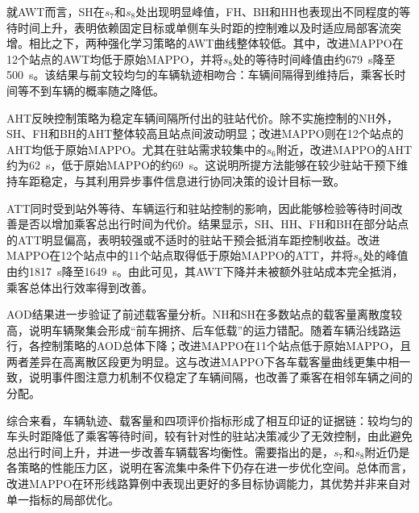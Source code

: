 就AWT而言，SH在$s_7$和$s_8$处出现明显峰值，FH、BH和HH也表现出不同程度的等待时间上升，表明依赖固定目标或单侧车头时距的控制难以及时适应局部客流突增。相比之下，两种强化学习策略的AWT曲线整体较低。其中，改进MAPPO在12个站点的AWT均低于原始MAPPO，并将$s_8$处的等待时间峰值由约679~s降至500~s。该结果与前文较均匀的车辆轨迹相吻合：车辆间隔得到维持后，乘客长时间等不到车辆的概率随之降低。

AHT反映控制策略为稳定车辆间隔所付出的驻站代价。除不实施控制的NH外，SH、FH和BH的AHT整体较高且站点间波动明显；改进MAPPO则在12个站点的AHT均低于原始MAPPO。尤其在驻站需求较集中的$s_6$附近，改进MAPPO的AHT约为62~s，低于原始MAPPO的约69~s。这说明所提方法能够在较少驻站干预下维持车距稳定，与其利用异步事件信息进行协同决策的设计目标一致。

ATT同时受到站外等待、车辆运行和驻站控制的影响，因此能够检验等待时间改善是否以增加乘客总出行时间为代价。结果显示，SH、HH、FH和BH在部分站点的ATT明显偏高，表明较强或不适时的驻站干预会抵消车距控制收益。改进MAPPO在12个站点中的11个站点取得低于原始MAPPO的ATT，并将$s_8$处的峰值由约1817~s降至1649~s。由此可见，其AWT下降并未被额外驻站成本完全抵消，乘客总体出行效率得到改善。

AOD结果进一步验证了前述载客量分析。NH和SH在多数站点的载客量离散度较高，说明车辆聚集会形成“前车拥挤、后车低载”的运力错配。随着车辆沿线路运行，各控制策略的AOD总体下降；改进MAPPO在11个站点低于原始MAPPO，且两者差异在高离散区段更为明显。这与改进MAPPO下各车载客量曲线更集中相一致，说明事件图注意力机制不仅稳定了车辆间隔，也改善了乘客在相邻车辆之间的分配。

综合来看，车辆轨迹、载客量和四项评价指标形成了相互印证的证据链：较均匀的车头时距降低了乘客等待时间，较有针对性的驻站决策减少了无效控制，由此避免总出行时间上升，并进一步改善车辆载客均衡性。需要指出的是，$s_7$和$s_8$附近仍是各策略的性能压力区，说明在客流集中条件下仍存在进一步优化空间。总体而言，改进MAPPO在环形线路算例中表现出更好的多目标协调能力，其优势并非来自对单一指标的局部优化。

